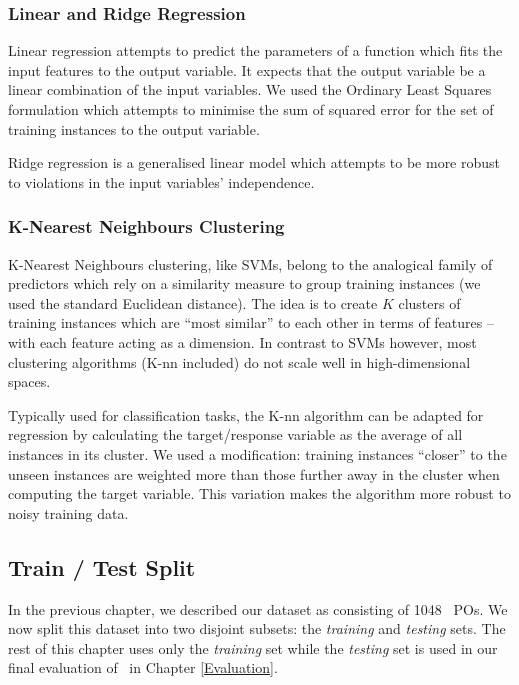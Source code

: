 \subsubsection{Linear and Ridge Regression} 

Linear regression attempts to predict the parameters of a function which fits the input features to the output variable. 
It expects that the output variable be a linear combination of the input variables.
We used the Ordinary Least Squares formulation which attempts to minimise the sum of squared error for the set of training instances to the output variable.    

Ridge regression \cite{ridge} is a generalised linear model which attempts to be more robust to violations in the input variables' independence. 

\subsubsection{K-Nearest Neighbours Clustering}

K-Nearest Neighbours clustering, like SVMs, belong to the analogical family of predictors which rely on a similarity measure to group training instances (we used the standard Euclidean distance).
The idea is to create $K$ clusters of training instances which are ``most similar'' to each other in terms of features -- with each feature acting as a dimension.   
In contrast to SVMs however, most clustering algorithms (K-nn included) do not scale well in high-dimensional spaces.

Typically used for classification tasks, the K-nn algorithm can be adapted for regression by calculating the target/response variable as the average of all instances in its cluster.
We used a modification: training instances ``closer'' to the unseen instances are weighted more than those further away in the cluster when computing the target variable.
This variation makes the algorithm more robust to noisy training data. 


\subsection{Train / Test Split}

In the previous chapter, we described our dataset as consisting of 1048 \why~POs.
We now split this dataset into two disjoint subsets: the \textit{training} and \textit{testing} sets. 
The rest of this chapter uses only the \textit{training} set while the \textit{testing} set is used in our final evaluation of \where~in Chapter \ref{Evaluation}.

